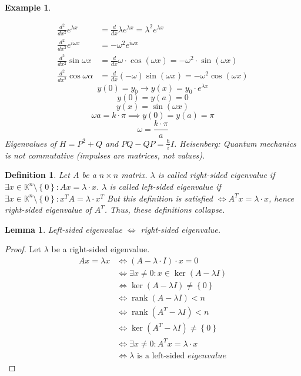 \documentclass[a4paper]{article}
\newcounter{lecref}[section]
\numberwithin{lecref}{section}
\newtheorem{example}[lecref]{Example}
\newtheorem{definition}[lecref]{Definition}
\newtheorem{lemma}[lecref]{Lemma}
\newcommand{\set}[1]{\left\{#1\right\}}
\DeclareMathOperator{\rank}{rank}
\begin{document}
\begin{example}
\begin{enumerate}
\begin{align*}
        \frac{d^2}{dx^2} e^{\lambda x} &= \frac{d}{dx} \lambda e^{\lambda x} = \lambda^2 e^{\lambda x} \\
        \frac{d^2}{dx^2} e^{i \omega x} &= -\omega^2 e^{i\omega x} \\
        \frac{d^2}{dx^2} \sin{\omega x} &= \frac{d}{dx} \omega \cdot \cos(\omega x) = -\omega^2 \cdot \sin(\omega x) \\
        \frac{d^2}{dx^2} \cos{\omega \alpha} &= \frac{d}{dx} (-\omega) \sin(\omega x) = -\omega^2 \cos(\omega x)
      \end{align*}
      \[ y(0) = y_0 \to y(x) = y_0 \cdot e^{\lambda x} \]
      \[ y(0) = y(a) = 0 \]
      \[ y(x) = \sin(\omega x) \]
      \[ \omega a = k \cdot \pi \implies y(0) = y(a) = \pi \]
      \[ \omega = \frac{k \cdot \pi}{a} \]
      Eigenvalues of $H = P^2 + Q$ and $PQ - QP = \frac{\hbar}{i} I$. Heisenberg: Quantum mechanics is not commutative (impulses are matrices, not values).
  \end{enumerate}
\end{example}

\begin{definition} %
  Let $A$ be a $n \times n$ matrix.
  $\lambda$ is called right-sided eigenvalue if $\exists x \in \mathbb K^n \setminus \set{0}: Ax = \lambda \cdot x$.
  $\lambda$ is called left-sided eigenvalue if $\exists x \in \mathbb K^n \setminus \set{0}: x^T A = \lambda \cdot x^T$
  But this definition is satisfied $\iff A^T x = \lambda \cdot x$, hence right-sided eigenvalue of $A^T$.
  Thus, these definitions collapse.
\end{definition}

\begin{lemma} %
  Left-sided eigenvalue $\iff$ right-sided eigenvalue.
\end{lemma}
\begin{proof}
  Let $\lambda$ be a right-sided eigenvalue.
  \begin{align*}
    Ax = \lambda x &\iff (A - \lambda \cdot I) \cdot x = 0 \\
      &\iff \exists x \neq 0: x \in \ker(A - \lambda I) \\
      &\iff \ker(A - \lambda I) \neq \set{0} \\
      &\iff \rank(A - \lambda I) < n \\
      &\iff \rank(A^T - \lambda I) < n \\
      &\iff \ker(A^T - \lambda I) \neq \set{0} \\
      &\iff \exists x \neq 0: A^T x = \lambda \cdot x \\
      &\iff \lambda \text{ is a left-sided } eigenvalue
  \end{align*}
\end{proof}
\end{document}
